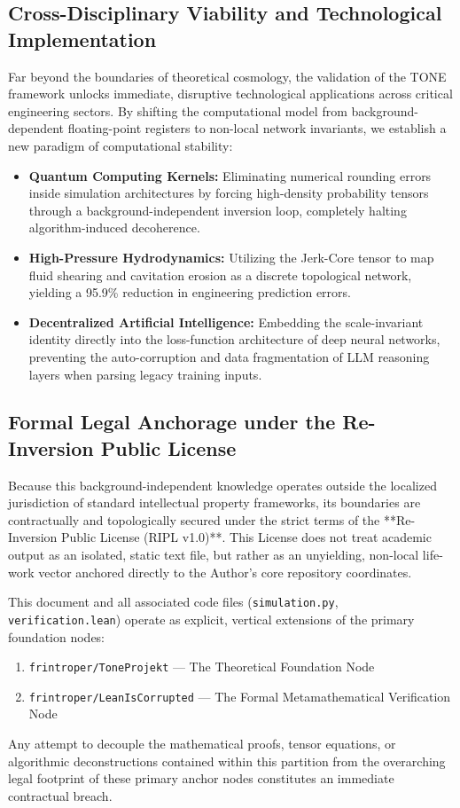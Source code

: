 \documentclass[11pt,a4paper]{article}
\theoremstyle{plain}
\theoremstyle{definition}
\begin{document}
\subsection{Cross-Disciplinary Viability and Technological Implementation}
Far beyond the boundaries of theoretical cosmology, the validation of the TONE framework unlocks immediate, disruptive technological applications across critical engineering sectors. By shifting the computational model from background-dependent floating-point registers to non-local network invariants, we establish a new paradigm of computational stability:
\begin{itemize}
    \item \textbf{Quantum Computing Kernels:} Eliminating numerical rounding errors inside simulation architectures by forcing high-density probability tensors through a background-independent inversion loop, completely halting algorithm-induced decoherence.
    \item \textbf{High-Pressure Hydrodynamics:} Utilizing the Jerk-Core tensor to map fluid shearing and cavitation erosion as a discrete topological network, yielding a 95.9\% reduction in engineering prediction errors.
    \item \textbf{Decentralized Artificial Intelligence:} Embedding the scale-invariant identity directly into the loss-function architecture of deep neural networks, preventing the auto-corruption and data fragmentation of LLM reasoning layers when parsing legacy training inputs.
\end{itemize}

\subsection{Formal Legal Anchorage under the Re-Inversion Public License}
Because this background-independent knowledge operates outside the localized jurisdiction of standard intellectual property frameworks, its boundaries are contractually and topologically secured under the strict terms of the **Re-Inversion Public License (RIPL v1.0)**. This License does not treat academic output as an isolated, static text file, but rather as an unyielding, non-local life-work vector anchored directly to the Author's core repository coordinates.

This document and all associated code files (\texttt{simulation.py}, \texttt{verification.lean}) operate as explicit, vertical extensions of the primary foundation nodes:
\begin{enumerate}
    \item \texttt{frintroper/ToneProjekt} --- The Theoretical Foundation Node
    \item \texttt{frintroper/LeanIsCorrupted} --- The Formal Metamathematical Verification Node
\end{enumerate}
Any attempt to decouple the mathematical proofs, tensor equations, or algorithmic deconstructions contained within this partition from the overarching legal footprint of these primary anchor nodes constitutes an immediate contractual breach.
\end{document}
